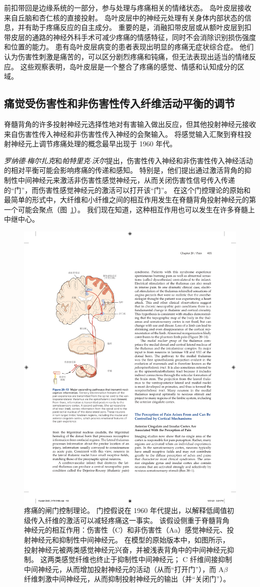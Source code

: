 前扣带回是边缘系统的一部分，参与处理与疼痛相关的情绪状态。
岛叶皮层接收来自丘脑和杏仁核的直接投射。
岛叶皮层中的神经元处理有关身体内部状态的信息，并有助于疼痛反应的自主成分。
重要的是，消融扣带皮层或从额叶皮层到扣带皮层的通路的神经外科手术可减少疼痛的情感特征，同时不会消除识别损伤强度和位置的能力。
患有岛叶皮层病变的患者表现出明显的疼痛无症状综合症。
他们认为伤害性刺激是痛苦的，可以区分剧烈疼痛和钝痛，但无法表现出适当的情绪反应。
这些观察表明，岛叶皮层是一个整合了疼痛的感觉、情感和认知成分的区域。



\subsection{痛觉受伤害性和非伤害性传入纤维活动平衡的调节}

脊髓背角的许多投射神经元选择性地对有害输入做出反应，但其他投射神经元接收来自伤害性传入神经和非伤害性传入神经的会聚输入。
将感觉输入汇聚到脊柱投射神经元上调节疼痛处理的概念最早出现于 1960 年代。


\textit{罗纳德$\cdot$梅尔扎克}和\textit{帕特里克$\cdot$沃尔}提出，伤害性传入神经和非伤害性传入神经活动的相对平衡可能会影响疼痛的传递和感知。
特别是，他们提出通过激活背角的抑制性中间神经元来激活非伤害性感觉神经元，从而关闭伤害性信号传入传递的“门”，而伤害性感觉神经元的激活可以打开该“门”。 
在这个门控理论的原始和最简单的形式中，大纤维和小纤维之间的相互作用发生在脊髓背角投射神经元的第一个可能会聚点（图~\ref{fig:20_16}）。
我们现在知道，这种相互作用也可以发生在许多脊髓上中继中心。


\begin{figure}[htbp]
	\centering
	\includegraphics[width=0.65\linewidth]{chap20/fig_20_13}
	\caption{疼痛的闸门控制理论。
		门控假说在 1960 年代提出，以解释低阈值初级传入纤维的激活可以减轻疼痛这一事实。
		该假设侧重于脊髓背角神经元的相互作用：伤害性（C）和非伤害性（Aa）感觉神经元、投射神经元和抑制性中间神经元。
		在模型的原始版本中，如图所示，投射神经元被两类感觉神经元兴奋，并被浅表背角中的中间神经元抑制。 
		这两类感觉纤维也终止于抑制性中间神经元；
		C 纤维间接抑制中间神经元，从而增加投射神经元的活动（从而“打开门”），而 A$ \beta $ 纤维刺激中间神经元，从而抑制投射神经元的输出（并“关闭门”）。}
	\label{fig:20_16}
\end{figure}


